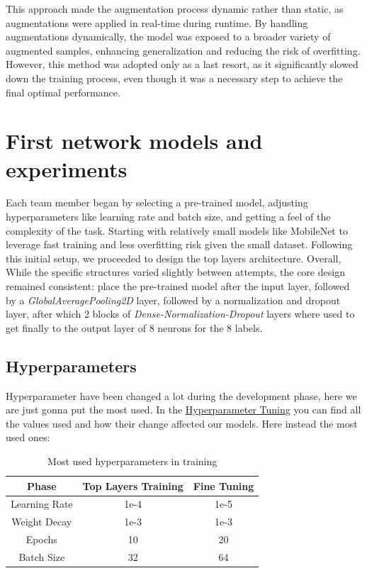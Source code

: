 \documentclass[11pt]{article}
\begin{document}
This approach made the augmentation process dynamic rather than static, as augmentations were applied in real-time during runtime. By handling augmentations dynamically, the model was exposed to a broader variety of augmented samples, enhancing generalization and reducing the risk of overfitting. However, this method was adopted only as a last resort, as it significantly slowed down the training process, even though it was a necessary step to achieve the final optimal performance.

\section{First network models and experiments}
Each team member began by selecting a pre-trained model, adjusting hyperparameters like learning rate and batch size, and getting a feel of the complexity of the task.
Starting with relatively small models like MobileNet to leverage fast training and less overfitting risk given the small dataset. 
Following this initial setup, we proceeded to design the top layers architecture. Overall, While the specific structures varied slightly between attempts, the core design remained consistent: place the pre-trained model after the input layer, followed by a \textit{GlobalAveragePooling2D} layer, followed by a normalization and dropout layer, after which 2 blocks of \textit{Dense-Normalization-Dropout} layers where used to get finally to the output layer of 8 neurons for the 8 labels.

\subsection{Hyperparameters}
Hyperparameter have been changed a lot during the development phase, here we are just gonna put the most used. In the \hyperref[hyperparametertuning]{Hyperparameter Tuning} you can find all the values used and how their change affected our models.
Here instead the most used ones:\\
\begin{table}[h!]
\centering
\begin{tabular}{|c|c|c|}
\hline
\textbf{Phase} & \textbf{Top Layers Training} & \textbf{Fine Tuning} \\ \hline
Learning Rate & 1e-4 & 1e-5 \\ \hline
Weight Decay & 1e-3 & 1e-3 \\ \hline
Epochs & 10 & 20 \\ \hline
Batch Size & 32 & 64 \\ \hline
\end{tabular}
\caption{Most used hyperparameters in training}
\end{table}
\end{document}
